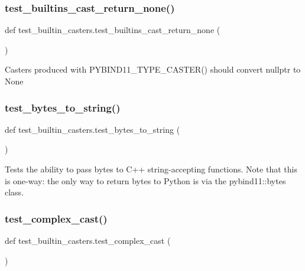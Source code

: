 \subsubsection{\texorpdfstring{test\_builtins\_cast\_return\_none()}{test\_builtins\_cast\_return\_none()}}
{\footnotesize\ttfamily def test\+\_\+builtin\+\_\+casters.\+test\+\_\+builtins\+\_\+cast\+\_\+return\+\_\+none (\begin{DoxyParamCaption}{ }\end{DoxyParamCaption})}

\begin{DoxyVerb}Casters produced with PYBIND11_TYPE_CASTER() should convert nullptr to None\end{DoxyVerb}
 \mbox{\label{namespacetest__builtin__casters_a80708f5886882d14233ea6c00b491fdd}} 
\subsubsection{\texorpdfstring{test\_bytes\_to\_string()}{test\_bytes\_to\_string()}}
{\footnotesize\ttfamily def test\+\_\+builtin\+\_\+casters.\+test\+\_\+bytes\+\_\+to\+\_\+string (\begin{DoxyParamCaption}{ }\end{DoxyParamCaption})}

\begin{DoxyVerb}Tests the ability to pass bytes to C++ string-accepting functions.  Note that this is
one-way: the only way to return bytes to Python is via the pybind11::bytes class.\end{DoxyVerb}
 \mbox{\label{namespacetest__builtin__casters_a1335b48e53f6b611e1406f26ecabf6ef}} 
\subsubsection{\texorpdfstring{test\_complex\_cast()}{test\_complex\_cast()}}
{\footnotesize\ttfamily def test\+\_\+builtin\+\_\+casters.\+test\+\_\+complex\+\_\+cast (\begin{DoxyParamCaption}{ }\end{DoxyParamCaption})}

